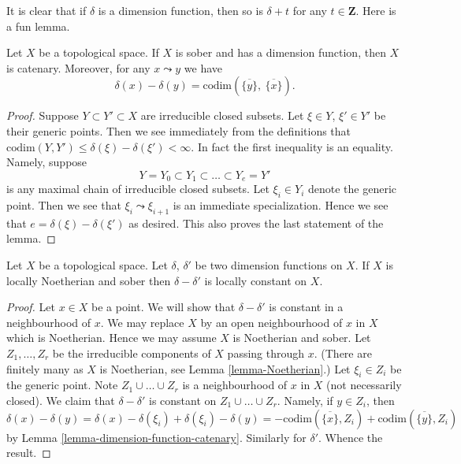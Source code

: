 \noindent
It is clear that if $\delta$ is a dimension function, then so is
$\delta + t$ for any $t \in \mathbf{Z}$. Here is a fun lemma.

\begin{lemma}
\label{lemma-dimension-function-catenary}
Let $X$ be a topological space. If $X$ is sober and has a dimension
function, then $X$ is catenary. Moreover, for any $x \leadsto y$
we have
$$
\delta(x) - \delta(y) =
\text{codim}\left(\overline{\{y\}},\ \overline{\{x\}}\right).
$$
\end{lemma}

\begin{proof}
Suppose $Y \subset Y' \subset X$ are irreducible closed subsets.
Let $\xi \in Y$, $\xi' \in Y'$ be their generic points.
Then we see immediately from the definitions that
$\text{codim}(Y, Y') \leq \delta(\xi) - \delta(\xi') < \infty$.
In fact the first inequality is an equality. Namely, suppose
$$
Y = Y_0 \subset Y_1 \subset \ldots \subset Y_e = Y'
$$
is any maximal chain of irreducible closed subsets. Let
$\xi_i \in Y_i$ denote the generic point. Then we see that
$\xi_i \leadsto \xi_{i + 1}$ is an immediate specialization.
Hence we see that $e = \delta(\xi) - \delta(\xi')$ as desired.
This also proves the last statement of the lemma.
\end{proof}

\begin{lemma}
\label{lemma-dimension-function-unique}
Let $X$ be a topological space.
Let $\delta$, $\delta'$ be two dimension functions on $X$.
If $X$ is locally Noetherian and sober then $\delta - \delta'$ is
locally constant on $X$.
\end{lemma}

\begin{proof}
Let $x \in X$ be a point. We will show that $\delta - \delta'$ is
constant in a neighbourhood of $x$.
We may replace $X$ by an open neighbourhood
of $x$ in $X$ which is Noetherian. Hence we may assume $X$ is
Noetherian and sober.
Let $Z_1, \ldots, Z_r$ be the irreducible
components of $X$ passing through $x$. (There are finitely many as
$X$ is Noetherian, see Lemma \ref{lemma-Noetherian}.)
Let $\xi_i \in Z_i$ be the generic point.
Note $Z_1 \cup \ldots \cup Z_r$ is a neighbourhood of $x$ in $X$
(not necessarily closed). We claim that $\delta - \delta'$ is
constant on $Z_1 \cup \ldots \cup Z_r$. Namely, if $y \in Z_i$,
then
$$
\delta(x) - \delta(y) = \delta(x) - \delta(\xi_i) + \delta(\xi_i) - \delta(y)
= - \text{codim}(\overline{\{x\}}, Z_i) 
+ \text{codim}(\overline{\{y\}}, Z_i)
$$
by Lemma \ref{lemma-dimension-function-catenary}.
Similarly for $\delta'$. Whence the result.
\end{proof}

